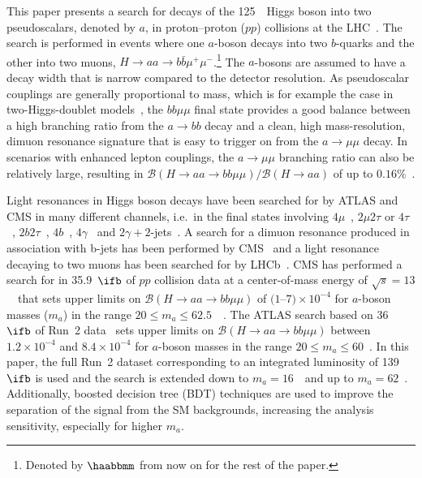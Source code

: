 \documentclass[cernpreprint, backref=false, texlive=2020, UKenglish, dvipsnames, block=none, texmf]{atlasdoc}
\begin{document}
This paper presents a search for decays of the 125~\GeV\ Higgs boson into two pseudoscalars, denoted by $a$, in proton--proton ($pp$) collisions at the LHC~\cite{Evans:2008zzb}.
The search is performed in events where one $a$-boson decays into two $b$-quarks and the other into two muons, $H\rightarrow aa \rightarrow b\bar{b}\mu^+\mu^-$.\footnote{Denoted by $\haabbmm$ from now on for the rest of the paper.} The $a$-bosons are assumed to have  a decay width that is narrow compared to the detector resolution.
As pseudoscalar couplings are generally proportional to  mass,
which is for example the case in two-Higgs-doublet models~\cite{Curtin:2013fra,Branco:2011iw},
the $bb\mu\mu$ final state provides a good balance between a high branching ratio from the $a\to bb$  decay and a clean, high mass-resolution, dimuon resonance signature that is easy to trigger on from the $a\to\mu\mu$  decay.
In scenarios with enhanced lepton couplings,
the $a\to\mu\mu$ branching ratio can also be relatively large, resulting in $\mathcal{B}(H\rightarrow aa\rightarrow bb\mu\mu)/ \mathcal{B}(H\rightarrow aa )$ of  up to $ 0.16\%$~\cite{Curtin:2014pda}.
 
Light resonances in Higgs boson decays have been searched for by ATLAS and CMS in many different channels, i.e.\ in the  final states involving $4\mu$~\cite{CMS-HIG-18-003,EXOT-2016-22}, $2\mu2\tau$ or $4\tau$~\cite{CMS-HIG-18-024,CMS-HIG-18-006,CMS-HIG-17-029,CMS-HIG-16-015,HIGG-2014-02}, $2b2\tau$~\cite{CMS-HIG-17-024}, $4b$~\cite{HIGG-2017-05,HDBS-2018-47}, $4\gamma$~\cite{EXOT-2013-24} and $2\gamma+2$-jets~\cite{HIGG-2017-09}.
A search for a dimuon resonance produced in association with b-jets has been performed by CMS~\cite{CMS:2018lce} and a light resonance decaying to two muons has been searched for by LHCb~\cite{LHCb:2020ysn}.
CMS has performed a search for \haabbmm in 35.9~$\ifb$ of $pp$ collision data at a center-of-mass energy of $\sqrt{s}=13$~\TeV\ that sets upper limits on $\mathcal{B}(H \rightarrow aa \rightarrow bb\mu\mu)$ of $\text{(1--7)}\times 10^{-4}$ for $a$-boson masses ($m_a$) in the range $20 \leq m_a \leq 62.5$~\GeV~\cite{CMS-HIG-18-011}.
The ATLAS search  based on 36~$\ifb$ of Run~2 data~\cite{bbmm36ifb} sets upper limits on $\mathcal{B}(H \rightarrow aa \rightarrow bb\mu\mu)$ between $1.2\times10^{-4}$ and $8.4\times10^{-4}$ for $a$-boson masses  in the range $20 \leq m_a \leq 60$~\GeV.
In this paper, the full Run~2 dataset corresponding to an integrated luminosity of 139~$\ifb$ is used and the search is extended down to $m_a=16$~\GeV\ and up to $m_a=62$~\GeV.
Additionally,   boosted decision tree (BDT) techniques are used to improve the separation of  the signal from the SM backgrounds, increasing the analysis sensitivity, especially for higher $m_a$.
 
\end{document}

